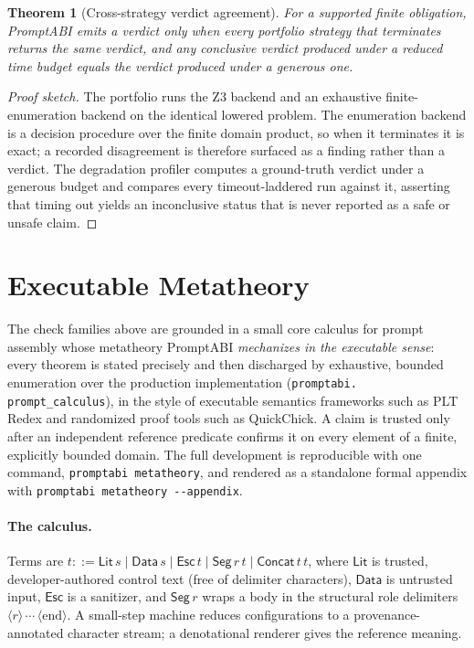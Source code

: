 \documentclass[10pt]{article}
\newtheorem{theorem}{Theorem}
\begin{document}
\begin{theorem}[Cross-strategy verdict agreement]
For a supported finite obligation, PromptABI emits a verdict only when every
portfolio strategy that terminates returns the same verdict, and any conclusive
verdict produced under a reduced time budget equals the verdict produced under a
generous one.
\end{theorem}

\begin{proof}[Proof sketch]
The portfolio runs the Z3 backend and an exhaustive finite-enumeration backend
on the identical lowered problem. The enumeration backend is a decision procedure
over the finite domain product, so when it terminates it is exact; a recorded
disagreement is therefore surfaced as a finding rather than a verdict. The
degradation profiler computes a ground-truth verdict under a generous budget and
compares every timeout-laddered run against it, asserting that timing out yields
an inconclusive status that is never reported as a safe or unsafe claim.
\end{proof}


\section{Executable Metatheory}
\label{sec:metatheory}

The check families above are grounded in a small core calculus for prompt
assembly whose metatheory PromptABI \emph{mechanizes in the executable sense}:
every theorem is stated precisely and then discharged by exhaustive, bounded
enumeration over the production implementation (\texttt{promptabi.\allowbreak
prompt\_calculus}), in the style of executable semantics frameworks such as PLT
Redex and randomized proof tools such as QuickChick. A claim is trusted only
after an independent reference predicate confirms it on every element of a
finite, explicitly bounded domain. The full development is reproducible with one
command, \texttt{promptabi metatheory}, and rendered as a standalone formal
appendix with \texttt{promptabi metatheory -{}-appendix}.

\paragraph{The calculus.}
Terms are $t ::= \mathsf{Lit}\,s \mid \mathsf{Data}\,s \mid \mathsf{Esc}\,t \mid
\mathsf{Seg}\,r\,t \mid \mathsf{Concat}\,t\,t$, where $\mathsf{Lit}$ is trusted,
developer-authored control text (free of delimiter characters), $\mathsf{Data}$
is untrusted input, $\mathsf{Esc}$ is a sanitizer, and $\mathsf{Seg}\,r$ wraps a
body in the structural role delimiters $\langle r\rangle\,\cdots\,\langle
\mathrm{end}\rangle$. A small-step machine reduces configurations to a
provenance-annotated character stream; a denotational renderer gives the
reference meaning.
\end{document}
